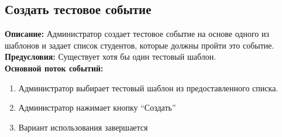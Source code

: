 \documentclass{article}
\begin{document}
    
    \subsection{Создать тестовое событие}
    \textbf{Описание:} Администратор создает тестовое событие на основе одного
    из шаблонов и задает список студентов, которые должны пройти это событие.\\
    \textbf{Предусловия:} Существует хотя бы один тестовый шаблон.\\
    \textbf{Основной поток событий:}
    \begin{enumerate}
        \item Администратор выбирает тестовый шаблон из предоставленного
        списка.
        \item Администратор нажимает кнопку “Создать”
        \item Вариант использования завершается
    \end{enumerate}




\end{document}
